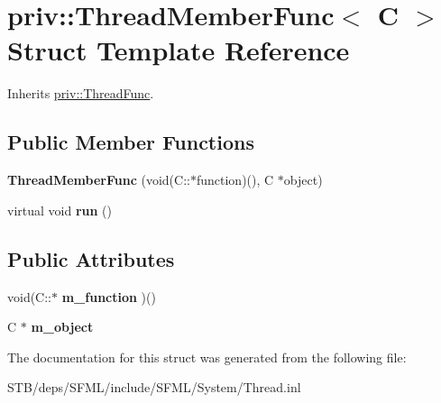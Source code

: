 \hypertarget{structpriv_1_1_thread_member_func}{\section{priv\+:\+:Thread\+Member\+Func$<$ C $>$ Struct Template Reference}
\label{structpriv_1_1_thread_member_func}
}


Inherits \hyperlink{structpriv_1_1_thread_func}{priv\+::\+Thread\+Func}.

\subsection*{Public Member Functions}
\begin{DoxyCompactItemize}
\item 
\hypertarget{structpriv_1_1_thread_member_func_ae44619c4cf6d886da6f32a1de37d652e}{{\bfseries Thread\+Member\+Func} (void(C\+::$\ast$function)(), C $\ast$object)}\label{structpriv_1_1_thread_member_func_ae44619c4cf6d886da6f32a1de37d652e}

\item 
\hypertarget{structpriv_1_1_thread_member_func_abbd440e93edf2747cf9cdde579bc5de0}{virtual void {\bfseries run} ()}\label{structpriv_1_1_thread_member_func_abbd440e93edf2747cf9cdde579bc5de0}

\end{DoxyCompactItemize}
\subsection*{Public Attributes}
\begin{DoxyCompactItemize}
\item 
\hypertarget{structpriv_1_1_thread_member_func_a237f80d81258c6553fd18e86880ab6c4}{void(C\+::$\ast$ {\bfseries m\+\_\+function} )()}\label{structpriv_1_1_thread_member_func_a237f80d81258c6553fd18e86880ab6c4}

\item 
\hypertarget{structpriv_1_1_thread_member_func_a849dd2e31c95e699fb316065d9d75116}{C $\ast$ {\bfseries m\+\_\+object}}\label{structpriv_1_1_thread_member_func_a849dd2e31c95e699fb316065d9d75116}

\end{DoxyCompactItemize}


The documentation for this struct was generated from the following file\+:\begin{DoxyCompactItemize}
\item 
S\+T\+B/deps/\+S\+F\+M\+L/include/\+S\+F\+M\+L/\+System/Thread.\+inl\end{DoxyCompactItemize}
